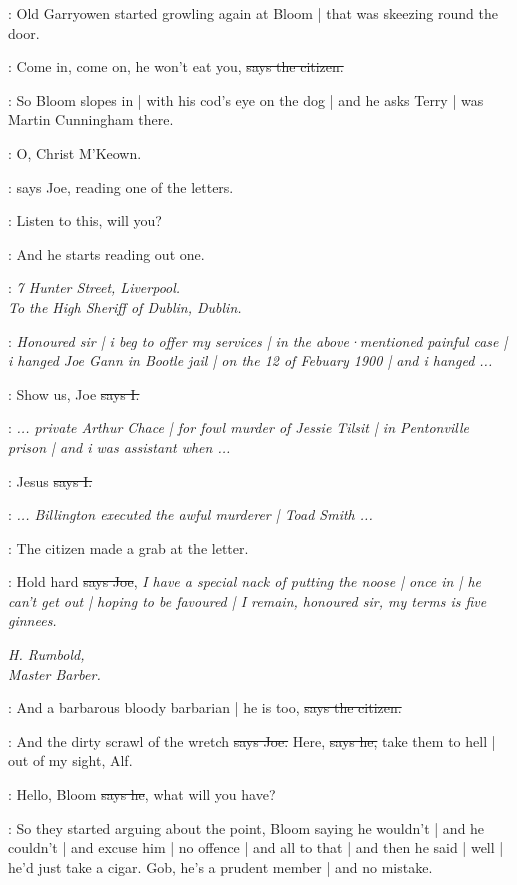 \Nq:
Old Garryowen started growling again at Bloom |
that was skeezing round the door.

\citizen:
Come in,
come on,
he won't eat you,
\sout{says the citizen.}


\Nq:
So Bloom slopes in |
with his cod's eye on the dog
 |
and he asks Terry |
was Martin Cunningham there.

\joe:
O,
Christ M'Keown.

\Nq:
says Joe,
reading one of the letters.

\joe:
Listen to this,
will you?

\Nq:
And he starts reading out one.


\joe:
\emph{7 Hunter Street,
Liverpool.\\
To the High Sheriff of Dublin,
Dublin.}

\joe:
\emph{Honoured sir |
i beg to offer my services |
in the above·mentioned painful case |
i hanged Joe Gann in Bootle jail |
on the 12 of Febuary 1900
 |
and i hanged ...}

:
Show us,
Joe
\sout{says I.}

\joe:
\emph{...
private Arthur Chace |
for fowl murder of Jessie Tilsit |
in Pentonville prison |
and i was assistant when ...}

:
Jesus
\sout{says I.}

\joe:
\emph{...
Billington executed the awful murderer |
Toad Smith ...}

\Nq:
The citizen made a grab at the letter.

\joe:
Hold hard
\sout{says Joe},
\emph{I have a special nack of putting the noose |
once in |
he can't get out |
hoping to be favoured |
I remain,
honoured sir,
my terms is five ginnees.}

\emph{%
H. Rumbold, \\
Master Barber.}

\citizen:
And a barbarous bloody barbarian |
he is too,
\sout{says the citizen.}

\joe:
And the dirty scrawl of the wretch
\sout{says Joe.}
Here,
\sout{says he,}
take them to hell |
out of my sight,
Alf.

\joe:
Hello,
Bloom
\sout{says he},
what will you have?

\Nq:
So they started arguing about the point,
Bloom saying he wouldn't |
and he couldn't |
and excuse him |
no offence |
and all to that |
and then he said |
well |
he'd just take a cigar.
Gob,
he's a prudent member |
and no mistake.

